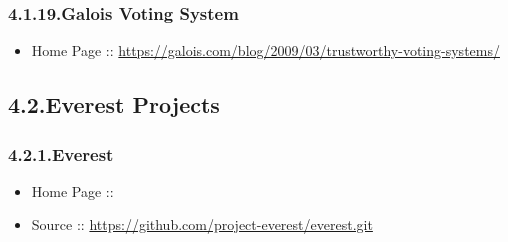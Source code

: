 \documentclass[12pt,twoside]{article}
\begin{document}
\subsubsection{4.1.19.\hspace*{0.5em}Galois Voting System}\label{sec-galois-voting-system}%

\begin{itemize}[noitemsep,topsep=\mdcompacttopsep]%

\item{}Home Page :: \href{https://galois.com/blog/2009/03/trustworthy-voting-systems/}{{\ttfamily https://\hspace{0pt}galois.\hspace{0pt}com/\hspace{0pt}blog/\hspace{0pt}2009/\hspace{0pt}03/\hspace{0pt}trustworthy-\hspace{0pt}voting-\hspace{0pt}systems/\hspace{0pt}}}%
\end{itemize}%

\subsection{4.2.\hspace*{0.5em}Everest Projects}\label{sec-everest-projects}%

\subsubsection{4.2.1.\hspace*{0.5em}Everest}\label{sec-everest}%

\begin{itemize}[noitemsep,topsep=\mdcompacttopsep]%

\item{}Home Page ::%

\item{}Source :: \href{https://github.com/project-everest/everest.git}{{\ttfamily https://\hspace{0pt}github.\hspace{0pt}com/\hspace{0pt}project-\hspace{0pt}everest/\hspace{0pt}everest.\hspace{0pt}git}}%
\end{itemize}%
\end{document}

